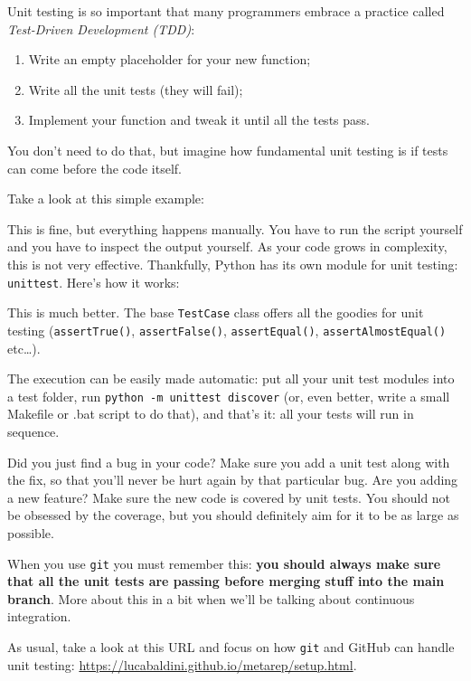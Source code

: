 Unit testing is so important that many programmers embrace a practice called \textit{Test-Driven Development (TDD)}:
\begin{enumerate}
    \item Write an empty placeholder for your new function;
    \item Write all the unit tests (they will fail);
    \item Implement your function and tweak it until all the tests pass.
\end{enumerate}
You don't need to do that, but imagine how fundamental unit testing is if tests can come before the code itself.

Take a look at this simple example:




This is fine, but everything happens manually. You have to run the script yourself and you have to inspect the output yourself. As your code grows in complexity, this is not very effective. Thankfully, Python has its own module for unit testing: \texttt{unittest}. Here's how it works:



This is much better. The base \texttt{TestCase} class offers all the goodies for unit testing (\texttt{assertTrue()}, \texttt{assertFalse()}, \texttt{assertEqual()}, \texttt{assertAlmostEqual()} etc\ldots).

The execution can be easily made automatic: put all your unit test modules into a test folder, run \texttt{python -m unittest discover} (or, even better, write a small Makefile or .bat script to do that), and that's it: all your tests will run in sequence.

Did you just find a bug in your code? Make sure you add a unit test along with the fix, so that you'll never be hurt again by that particular bug. Are you adding a new feature? Make sure the new code is covered by unit tests. You should not be obsessed by the coverage, but you should definitely aim for it to be as large as possible.

When you use \texttt{git} you must remember this: \textbf{you should always make sure that all the unit tests are passing before merging stuff into the main branch}. More about this in a bit when we'll be talking about continuous integration.

As usual, take a look at this URL and focus on how \texttt{git} and GitHub can handle unit testing: \url{https://lucabaldini.github.io/metarep/setup.html}.

